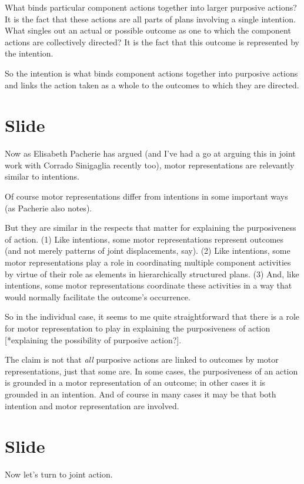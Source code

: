 \documentclass[12pt,\papersize]{extarticle}
\begin{document}
What binds particular component actions together into larger purposive actions?  It is the fact that these actions are all parts of plans involving a single intention.
What singles out an actual or possible outcome as one to which the component actions are collectively directed?  It is the fact that this outcome is represented by the intention.

So the intention is what binds component actions together into purposive actions and links the action taken as a whole to the outcomes to which they are directed.



\section{Slide}
Now as Elisabeth Pacherie has argued \citep[pp.\ 189-90]{pacherie:2008_action} (and I’ve had a go at arguing this in joint work with Corrado Sinigaglia recently too),
motor representations are relevantly similar to intentions.

Of course motor representations differ from intentions in some important ways (as Pacherie also notes).

But they are similar in the respects that matter for explaining the purposiveness of action.
(1) Like intentions, some motor representations represent outcomes (and not merely patterns of joint displacements, say).
(2) Like intentions, some motor representations play a role in coordinating multiple  component activities by virtue of their role as elements in hierarchically structured plans.
(3) And, like intentions, some motor representations coordinate these activities in a way that would normally facilitate the outcome’s occurrence.

So in the individual case, it seems to me quite straightforward that there is a role for motor representation to play in explaining the purposiveness of action [*explaining the possibility of purposive action?].

The claim is not that \emph{all} purposive actions are linked to outcomes by motor representations, just that some are.
In some cases, the purposiveness of an action is grounded in a motor representation of an outcome; in other cases it is grounded in an intention.
And of course in many cases it may be that both intention and motor representation are involved.



\section{Slide}
Now let’s turn to joint action.
\end{document}
